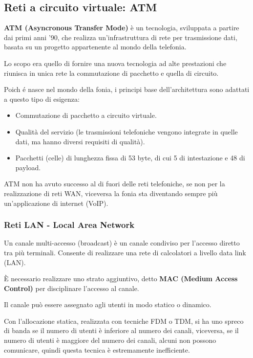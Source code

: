     \subsection{Reti a circuito virtuale: ATM}
        \textbf{ATM (Asyncronous Transfer Mode)} è un tecnologia, sviluppata a partire dai primi anni '90, che realizza un'infrastruttura di rete per trasmissione dati, basata su un progetto appartenente al mondo della telefonia.
    
        Lo scopo era quello di fornire una nuova tecnologia ad alte prestazioni che riunisca in unica rete la commutazione di pacchetto e quella di circuito.

        Poich é nasce nel mondo della fonia, i principi base dell’architettura sono adattati a questo tipo di esigenza:
        \begin{itemize}
            \item Commutazione di pacchetto a circuito virtuale.
            \item Qualità del servizio (le trasmissioni telefoniche vengono integrate in quelle dati, ma hanno diversi requisiti di qualità).
            \item Pacchetti (celle) di lunghezza fissa di 53 byte, di cui 5 di intestazione e 48 di payload.
        \end{itemize}

        ATM non ha avuto successo al di fuori delle reti telefoniche, se non per la realizzazione di reti WAN, viceversa la fonia sta diventando sempre più un'applicazione di internet (VoIP).

        \subsubsection{Reti LAN - Local Area Network}
            Un canale multi-accesso (broadcast) è un canale condiviso per l’accesso diretto tra più terminali. Consente di realizzare una rete di calcolatori a livello data link (LAN).
        
            È necessario realizzare uno strato aggiuntivo, detto \textbf{MAC (Medium Access Control)} per disciplinare l'accesso al canale.

            Il canale può essere assegnato agli utenti in modo statico o dinamico.

            Con l'allocazione statica, realizzata con tecniche FDM o TDM, si ha uno spreco di banda se il numero di utenti è inferiore al numero dei canali, viceversa, se il numero di utenti è maggiore del numero dei canali, alcuni non possono comunicare, quindi questa tecnica è estremamente inefficiente.

